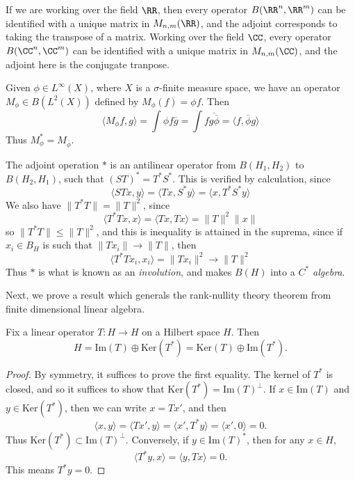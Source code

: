 \begin{example}
    If we are working over the field $\RR$, then every operator $B(\RR^n, \RR^m)$ can be identified with a unique matrix in $M_{n,m}(\RR)$, and the adjoint corresponds to taking the transpose of a matrix. Working over the field $\CC$, every operator $B(\CC^n, \CC^m)$ can be identified with a unique matrix in $M_{n,m}(\CC)$, and the adjoint here is the conjugate tranpose.
\end{example}

\begin{example}
    Given $\phi \in L^\infty(X)$, where $X$ is a $\sigma$-finite measure space, we have an operator $M_\phi \in B(L^2(X))$ defined by $M_\phi(f) = \phi f$. Then
    \[ \langle M_\phi f, g \rangle = \int \phi f \overline{g} = \int f \overline{g \overline{\phi}} = \langle f, \overline{\phi} g \rangle \]
    Thus $M_\phi^* = M_{\overline{\phi}}$.
\end{example}

The adjoint operation $*$ is an antilinear operator from $B(H_1,H_2)$ to $B(H_2,H_1)$, such that $(ST)^* = T^*S^*$. This is verified by calculation, since
%
\[ \langle ST x, y \rangle = \langle Tx, S^* y \rangle = \langle x, T^*S^* y \rangle \]
%
We also have $\| T^*T \| = \| T \|^2$, since
%
\[ \langle T^*T x, x \rangle = \langle Tx, Tx \rangle = \| T \|^2 \| x \| \]
%
so $\| T^*T \| \leq \| T \|^2$, and this is inequality is attained in the suprema, since if $x_i \in B_H$ is such that $\| T x_i \| \to \| T \|$, then
%
\[ \langle T^*T x_i, x_i \rangle = \| T x_i \|^2 \to \| T \|^2 \]
%
Thus $*$ is what is known as an \emph{involution}, and makes $B(H)$ into a \emph{$C^*$ algebra}.

Next, we prove a result which generals the rank-nullity theory theorem from finite dimensional linear algebra.

\begin{theorem}
    Fix a linear operator $T: H \to H$ on a Hilbert space $H$. Then
    \[  H = \text{Im}(T) \oplus \text{Ker}(T^*) = \text{Ker}(T) \oplus \text{Im}(T^*). \]
\end{theorem}
\begin{proof}
    By symmetry, it suffices to prove the first equality. The kernel of $T^*$ is closed, and so it suffices to show that $\text{Ker}(T^*) = \text{Im}(T)^\perp$. If $x \in \text{Im}(T)$ and $y \in \text{Ker}(T^*)$, then we can write $x = Tx'$, and then
    \[ \langle x, y \rangle = \langle Tx', y \rangle = \langle x', T^* y \rangle = \langle x', 0 \rangle = 0. \]
    Thus $\text{Ker}(T^*) \subset \text{Im}(T)^\perp$. Conversely, if $y \in \text{Im}(T)^*$, then for any $x \in H$,
    \[ \langle T^* y, x \rangle = \langle y, Tx \rangle = 0. \]
    This means $T^* y = 0$.
\end{proof}

